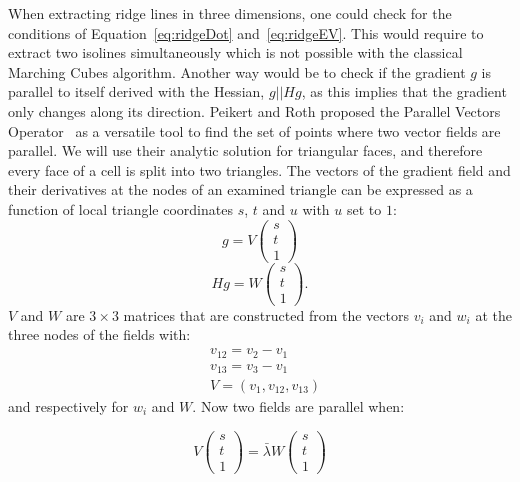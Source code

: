 When extracting ridge lines in three dimensions, one could check for the
conditions of Equation~\ref{eq:ridgeDot} and~\ref{eq:ridgeEV}. This
would require to extract two isolines simultaneously which is not
possible with the classical Marching Cubes algorithm. Another way would
be to check if the gradient $g$ is parallel to itself derived with the
Hessian, $g || H g$, as this implies that the gradient only changes
along its direction. Peikert and Roth proposed the Parallel Vectors
Operator~\cite{PV} as a versatile tool to find the set of points where
two vector fields are parallel. We will use their analytic solution for
triangular faces, and therefore every face of a cell is split into two
triangles. The vectors of the gradient field and their derivatives at
the nodes of an examined triangle can be expressed as a function of
local triangle coordinates $s$, $t$ and $u$ with $u$ set to $1$:
\begin{equation}
  g = V
  \begin{pmatrix}
    s\\
    t\\
    1
  \end{pmatrix}
\end{equation}
\begin{equation}
  H g = W
  \begin{pmatrix}
    s\\
    t\\
    1
  \end{pmatrix}.
\end{equation}
\noindent $V$ and $W$ are $3 \times 3$ matrices that are constructed
from the vectors $v_i$ and $w_i$ at the three nodes of the fields with:
\begin{align}
  &v_{12} = v_2 - v_1\\
  &v_{13} = v_3 - v_1\\
  &V = (v_1, v_{12}, v_{13})
\end{align}
\noindent and respectively for $w_i$ and $W$. Now two fields are
parallel when:

\begin{equation}
  V
  \begin{pmatrix}
    s\\
    t\\
    1
  \end{pmatrix}
  = \bar{\lambda} W
  \begin{pmatrix}
    s\\
    t\\
    1
  \end{pmatrix}
\end{equation}

